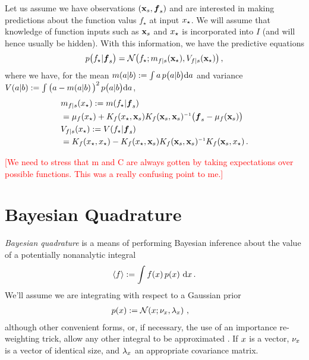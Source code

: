 \documentclass{article}
\renewcommand{\pskinny}[2]{p\big(#1|#2\big)}
\begin{document}
Let us assume we have observations $(\vlfv_s,\vf_s)$ and
are interested in making predictions about the function
valus $f_\star$ at input $\lfv_\star$. We will assume that knowledge of function inputs such as
$\vlfv_s$ and $\lfv_\star$ is incorporated into $I$ (and will hence usually be hidden). With
this information, we have the predictive equations
$$
\pskinny{f\st}{\vf_s} = 
\bN{f\st}
{\meancond{f}{\vlfv_\star}{s}}
{\covcond{f}{\vlfv_\star}{s}}\,,
$$
where we have, for the mean $\novmean{a}{b}\deq \int a\,\pskinny{a}{b} \ud
a$ and variance $\novcov{a}{b}\deq \int
\big(a-\novmean{a}{b}\big)^2\,\pskinny{a}{b} \ud a$,
\begin{align} 
\textstyle
&\meancond{f}{\lfv_\star}{s}
\deq \mean{f_\star}{\vf_s}
\nonumber\\
&= \mu_{f}(\lfv_\star) + 
K_{f}(\lfv_\star,\vlfv_s)
K_{f}(\vlfv_s,\vlfv_s)\inv
\bigl(\vf_s-{\mu}_{f}(\vlfv_s)\bigr) \label{eq:GPMean}
\\
&\covcond{f}{\lfv_\star}{s}
\deq {\cov{f_\star}{\vf_s}} 
\nonumber\\
&= K_{f}(\lfv_\star,\lfv_\star) - 
K_{f}(\lfv_\star,\vlfv_s)
K_{f}(\vlfv_s,\vlfv_s)\inv
K_{f}(\vlfv_s,\lfv_\star)\,. \nonumber%
\end{align} 

\textcolor{red}{[We need to stress that m and C are always gotten by taking expectations over possible functions.  This was a really confusing point to me.]}

\section{Bayesian Quadrature} \label{sec:BQ}


\emph{Bayesian quadrature} \citep{BZHermiteQuadrature,BZMonteCarlo} is a means of
performing Bayesian inference about the value of a potentially
nonanalytic integral 
\begin{equation} \label{eq:intyf}
 \inty{f} \deq \int f(\lfv)\,\po{\lfv}\,\ud\lfv\,.
\end{equation}
We'll assume we are integrating with respect to a Gaussian
prior
\begin{align}\label{eq:phiprior}
\textstyle
 \po{\lfv} & \deq \N{\lfv}{\nu_{\lfv}}{\lambda_{\lfv}} \,,
\end{align}
although other convenient forms, or, if necessary, the use of an
importance re-weighting trick, allow any other integral to be
approximated \citep{OsborneAnon}. If $\lfv$ is a vector, $\nu_{\lfv}$ is a  vector of identical size, and $\lambda_{\lfv}$ an appropriate covariance matrix.
\end{document}
